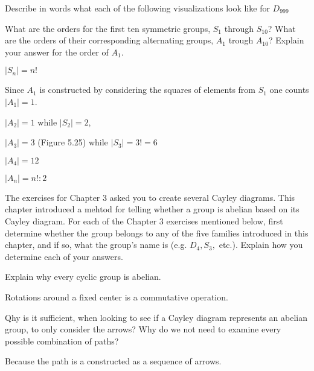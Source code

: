 \begin{questions}
	\question Describe in words what each of the following visualizations look like for $D_{999}$
	
	\question What are the orders for the first ten symmetric groups, $S_1$ through $S_{10}$? What are the orders of their corresponding alternating groups, $A_1$ trough $A_{10}$? Explain your answer for the order of $A_1$.
	\begin{solution}
		\par $|S_n| = n!$
		
		\par Since $A_1$ is constructed by considering the squares of elements from $S_1$ one counts $|A_1| = 1$.
		
		\par $|A_2| = 1$ while $|S_2| = 2$,
		\par $|A_3| = 3$ (Figure 5.25) while $|S_3| = 3! = 6$
		\par $|A_4| = 12$
		\par $|A_n| = n! : 2$
	\end{solution}

	\question The exercises for Chapter 3 asked you to create several Cayley diagrams. This chapter introduced a mehtod for telling whether a group is abelian based on its Cayley diagram. For each of the Chapter 3 exercises mentioned below, first determine whether the group belongs to any of the five families introduced in this chapter, and if so, what the group's name is (e.g. $D_4, S_3,$ etc.). Explain how you determine each of your answers.


	\question Explain why every cyclic group is abelian.
	\begin{solution}
		\par Rotations around a fixed center is a commutative operation.
	\end{solution}
	
	\question Qhy is it sufficient, when looking to see if a Cayley diagram represents an abelian group, to only consider the arrows? Why do we not need to examine every possible combination of paths?
	\begin{solution}
		\par Because the path is a constructed as a sequence of arrows.
	\end{solution}
	

\end{questions}
